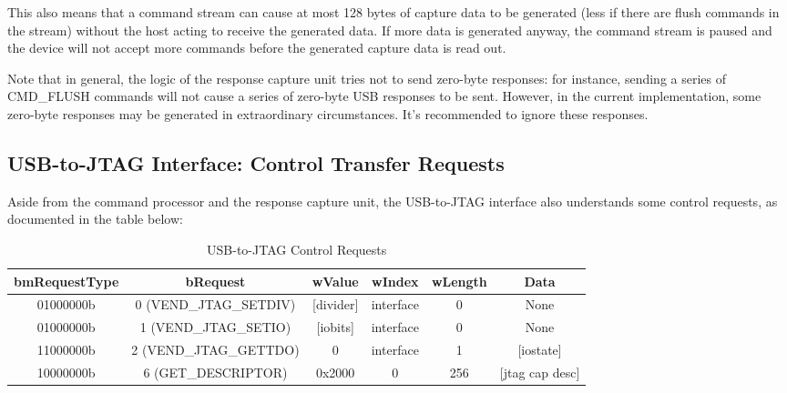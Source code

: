 \documentclass[main\_\_EN.tex]{subfiles}
\begin{document}
This also means that a command stream can cause at most 128 bytes of capture data to be generated (less if there are flush commands in the stream) without the host acting to receive the generated data. If more data is generated anyway, the command stream is paused and the device will not accept more commands before the generated capture data is read out.

Note that in general, the logic of the response capture unit tries not to send zero-byte responses: for instance, sending a series of CMD\_FLUSH commands will not cause a series of zero-byte USB responses to be sent. However, in the current implementation, some zero-byte responses may be generated in extraordinary circumstances. It's recommended to ignore these responses.

\subsection{USB-to-JTAG Interface: Control Transfer Requests}

Aside from the command processor and the response capture unit, the USB-to-JTAG interface also understands some control requests, as documented in the table below:

\begin{table}[H]
    \centering
    \caption{USB-to-JTAG Control Requests}
    \label{tab:usbserialjtag-control-requests}
    \begin{tabular}{|c|c|c|c|c|c|}
    \hline
       \rowcolor{lightgray}
       \textbf{bmRequestType} & \textbf{bRequest} & \textbf{wValue} & \textbf{wIndex} & \textbf{wLength} & \textbf{Data} \\\hline
       
       01000000b &  0 (VEND\_JTAG\_SETDIV) & [divider] & interface & 0 &  None \\\hline
       01000000b &  1 (VEND\_JTAG\_SETIO) &  [iobits] &  interface & 0 &   None \\\hline
       11000000b &  2 (VEND\_JTAG\_GETTDO) & 0 & interface & 1 & [iostate] \\\hline
       10000000b &  6 (GET\_DESCRIPTOR) &   0x2000 &  0 &  256 & [jtag cap desc] \\\hline
    \end{tabular}
\end{table}
\end{document}
